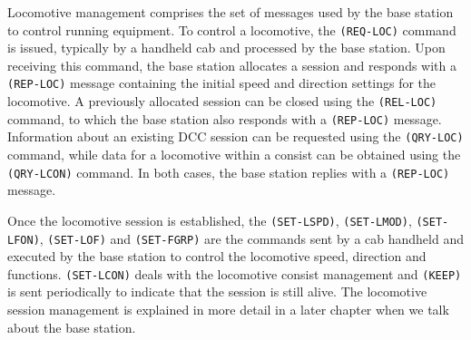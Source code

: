 
Locomotive management comprises the set of messages used by the base station to control running equipment. To control a locomotive, the \texttt{(REQ-LOC)} command is issued, typically by a handheld cab and processed by the base station. Upon receiving this command, the base station allocates a session and responds with a \texttt{(REP-LOC)} message containing the initial speed and direction settings for the locomotive. A previously allocated session can be closed using the \texttt{(REL-LOC)} command, to which the base station also responds with a \texttt{(REP-LOC)} message. Information about an existing DCC session can be requested using the \texttt{(QRY-LOC)} command, while data for a locomotive within a consist can be obtained using the \texttt{(QRY-LCON)} command. In both cases, the base station replies with a \texttt{(REP-LOC)} message.

\begin{table}[ht!]
    \centering 
\end{table}

Once the locomotive session is established, the \texttt{(SET-LSPD)}, \texttt{(SET-LMOD)}, \texttt{(SET-LFON)}, \texttt{(SET-LOF)} and \texttt{(SET-FGRP)} are the commands sent by a cab handheld and executed by the base station to control the locomotive speed, direction and functions. \texttt{(SET-LCON)} deals with the locomotive consist management and \texttt{(KEEP)} is sent periodically to indicate that the session is still alive. The locomotive session management is explained in more detail in a later chapter when we talk about the base station.

